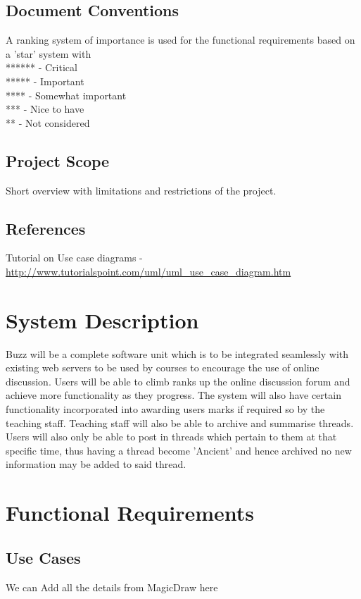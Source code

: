 \documentclass[12pt]{article}
\begin{document}
\subsection{Document Conventions}
A ranking system of importance is used for the functional requirements based on a 'star' system with 
\\****** - Critical
\\*****  - Important
\\ ****  - Somewhat important
\\  ***  - Nice to have
\\  **   - Not considered


\subsection{Project Scope}
Short overview with limitations and restrictions of the project.

\subsection{References}
Tutorial on Use case diagrams - \url{http://www.tutorialspoint.com/uml/uml_use_case_diagram.htm}

\section{System Description}
Buzz will be a complete software unit which is to be integrated seamlessly with existing web servers to be used by courses to encourage the use of online discussion. Users will be able to climb ranks up the online discussion forum and achieve more functionality as they progress. The system will also have certain functionality incorporated into awarding users marks if required so by the teaching staff. Teaching staff will also be able to archive and summarise threads. Users will also only be able to post in threads which pertain to them at that specific time, thus having a thread become 'Ancient' and hence archived no new information may be added to said thread.
\newpage %
\section{Functional Requirements}

\subsection{Use Cases}
We can Add all the details from MagicDraw here
\end{document}
